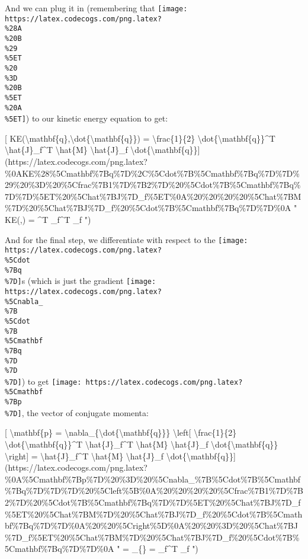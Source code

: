 \documentclass[]{article}
\begin{document}
And we can plug it in (remembering that
\texttt{[image: https://latex.codecogs.com/png.latex?\\\%28A\\\%20B\\\%29\\\%5ET\\\%20\\\%3D\\\%20B\\\%5ET\\\%20A\\\%5ET]})
to our kinetic energy equation to get:

{[}
KE(\textbackslash{}mathbf\{q\},\textbackslash{}dot\{\textbackslash{}mathbf\{q\}\})
= \textbackslash{}frac\{1\}\{2\}
\textbackslash{}dot\{\textbackslash{}mathbf\{q\}\}\^{}T
\textbackslash{}hat\{J\}\_f\^{}T \textbackslash{}hat\{M\}
\textbackslash{}hat\{J\}\_f
\textbackslash{}dot\{\textbackslash{}mathbf\{q\}\}{]}(https://latex.codecogs.com/png.latex?\%0AKE\%28\%5Cmathbf\%7Bq\%7D\%2C\%5Cdot\%7B\%5Cmathbf\%7Bq\%7D\%7D\%29\%20\%3D\%20\%5Cfrac\%7B1\%7D\%7B2\%7D\%20\%5Cdot\%7B\%5Cmathbf\%7Bq\%7D\%7D\%5ET\%20\%5Chat\%7BJ\%7D\_f\%5ET\%0A\%20\%20\%20\%20\%5Chat\%7BM\%7D\%20\%5Chat\%7BJ\%7D\_f\%20\%5Cdot\%7B\%5Cmathbf\%7Bq\%7D\%7D\%0A
" KE(,) =  \^{}T
\_f\^{}T  \_f  ")

And for the final step, we differentiate with respect to the
\texttt{[image: https://latex.codecogs.com/png.latex?\\\%5Cdot\\\%7Bq\\\%7D]}s (which
is just the gradient
\texttt{[image: https://latex.codecogs.com/png.latex?\\\%5Cnabla\_\\\%7B\\\%5Cdot\\\%7B\\\%5Cmathbf\\\%7Bq\\\%7D\\\%7D\\\%7D]})
to get
\texttt{[image: https://latex.codecogs.com/png.latex?\\\%5Cmathbf\\\%7Bp\\\%7D]}, the
vector of conjugate momenta:

{[} \textbackslash{}mathbf\{p\} =
\textbackslash{}nabla\_\{\textbackslash{}dot\{\textbackslash{}mathbf\{q\}\}\}
\textbackslash{}left{[} \textbackslash{}frac\{1\}\{2\}
\textbackslash{}dot\{\textbackslash{}mathbf\{q\}\}\^{}T
\textbackslash{}hat\{J\}\_f\^{}T \textbackslash{}hat\{M\}
\textbackslash{}hat\{J\}\_f \textbackslash{}dot\{\textbackslash{}mathbf\{q\}\}
\textbackslash{}right{]} = \textbackslash{}hat\{J\}\_f\^{}T
\textbackslash{}hat\{M\} \textbackslash{}hat\{J\}\_f
\textbackslash{}dot\{\textbackslash{}mathbf\{q\}\}{]}(https://latex.codecogs.com/png.latex?\%0A\%5Cmathbf\%7Bp\%7D\%20\%3D\%20\%5Cnabla\_\%7B\%5Cdot\%7B\%5Cmathbf\%7Bq\%7D\%7D\%7D\%20\%5Cleft\%5B\%0A\%20\%20\%20\%20\%5Cfrac\%7B1\%7D\%7B2\%7D\%20\%5Cdot\%7B\%5Cmathbf\%7Bq\%7D\%7D\%5ET\%20\%5Chat\%7BJ\%7D\_f\%5ET\%20\%5Chat\%7BM\%7D\%20\%5Chat\%7BJ\%7D\_f\%20\%5Cdot\%7B\%5Cmathbf\%7Bq\%7D\%7D\%0A\%20\%20\%5Cright\%5D\%0A\%20\%20\%3D\%20\%5Chat\%7BJ\%7D\_f\%5ET\%20\%5Chat\%7BM\%7D\%20\%5Chat\%7BJ\%7D\_f\%20\%5Cdot\%7B\%5Cmathbf\%7Bq\%7D\%7D\%0A
"  = \nabla\_\{\}  = \_f\^{}T  \_f  ")
\end{document}
